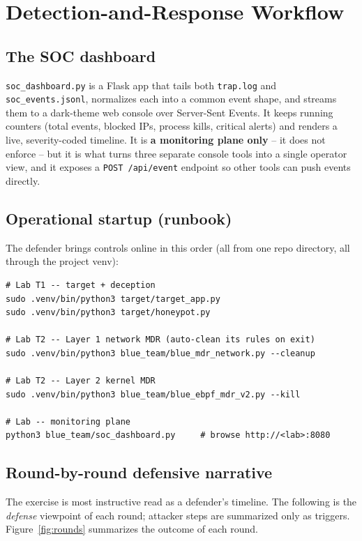 \documentclass[11pt]{article}
\newcommand{\co}[1]{\texttt{#1}}
\begin{document}
\section{Detection-and-Response Workflow}

\subsection{The SOC dashboard}
\co{soc\_dashboard.py} is a Flask app that tails both \co{trap.log} and
\co{soc\_events.jsonl}, normalizes each into a common event shape, and
streams them to a dark-theme web console over Server-Sent Events. It keeps
running counters (total events, blocked IPs, process kills, critical
alerts) and renders a live, severity-coded timeline. It is \textbf{a
monitoring plane only} -- it does not enforce -- but it is what turns three
separate console tools into a single operator view, and it exposes a
\co{POST /api/event} endpoint so other tools can push events directly.

\subsection{Operational startup (runbook)}
The defender brings controls online in this order (all from one repo
directory, all through the project venv):
\begin{lstlisting}
# Lab T1 -- target + deception
sudo .venv/bin/python3 target/target_app.py
sudo .venv/bin/python3 target/honeypot.py

# Lab T2 -- Layer 1 network MDR (auto-clean its rules on exit)
sudo .venv/bin/python3 blue_team/blue_mdr_network.py --cleanup

# Lab T2 -- Layer 2 kernel MDR
sudo .venv/bin/python3 blue_team/blue_ebpf_mdr_v2.py --kill

# Lab -- monitoring plane
python3 blue_team/soc_dashboard.py     # browse http://<lab>:8080
\end{lstlisting}

\subsection{Round-by-round defensive narrative}
The exercise is most instructive read as a defender's timeline. The
following is the \emph{defense} viewpoint of each round; attacker steps are
summarized only as triggers. Figure~\ref{fig:rounds} summarizes the outcome
of each round.
\end{document}
